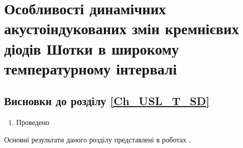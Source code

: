 \chapter{Особливості динамічних акустоіндукованих змін кремнієвих діодів Шотки в широкому температурному інтервалі\label{Ch_USL_T_SD}}

\section*{Висновки до розділу \ref{Ch_USL_T_SD}}
  \begin{enumerate}
     \item Проведено
  \end{enumerate}	
  
Основні результати даного розділу представлені в роботах \cite{Olikh:Rev,6CPFCS}.
